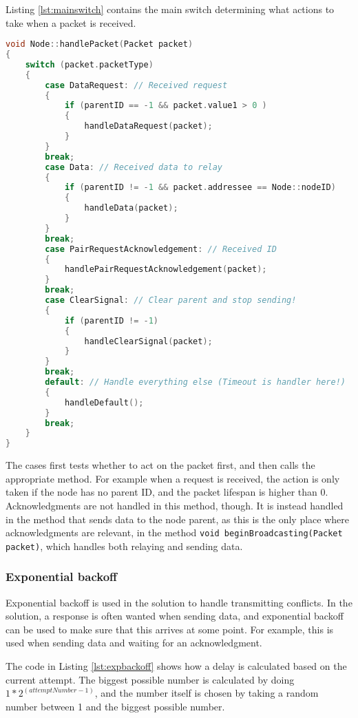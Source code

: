 Listing \ref{lst:mainswitch} contains the main switch determining what actions to take when a packet is received. 
\begin{lstlisting}[language=C,caption={The packet handling method.},label={lst:mainswitch}]
void Node::handlePacket(Packet packet)
{
    switch (packet.packetType)
    {
        case DataRequest: // Received request
        {
            if (parentID == -1 && packet.value1 > 0 )
            {
                handleDataRequest(packet);
            }
        }
        break;
        case Data: // Received data to relay
        {
            if (parentID != -1 && packet.addressee == Node::nodeID)
            {
                handleData(packet);
            }
        }
        break;
        case PairRequestAcknowledgement: // Received ID
        {
            handlePairRequestAcknowledgement(packet);
        }
        break;
        case ClearSignal: // Clear parent and stop sending!
        {
            if (parentID != -1)
            {
                handleClearSignal(packet);
            }
        }
        break;
        default: // Handle everything else (Timeout is handler here!)
        {
            handleDefault();
        }
        break;
    }
}
\end{lstlisting}
The cases first tests whether to act on the packet first, and then calls the appropriate method. For example when a request is received, the action is only taken if the node has no parent ID, and the packet lifespan is higher than 0. Acknowledgments are not handled in this method, though. It is instead handled in the method that sends data to the node parent, as this is the only place where acknowledgments are relevant, in the method \texttt{void beginBroadcasting(Packet packet)}, which handles both relaying and sending data.


\subsubsection*{Exponential backoff}
Exponential backoff is used in the solution to handle transmitting conflicts. In the solution, a response is often wanted when sending data, and exponential backoff can be used to make sure that this arrives at some point. For example, this is used when sending data and waiting for an acknowledgment.

The code in Listing \ref{lst:expbackoff} shows how a delay is calculated based on the current attempt.
The biggest possible number is calculated by doing $1 * 2^(attemptNumber-1)$, and the number itself is chosen by taking a random number between 1 and the biggest possible number.

